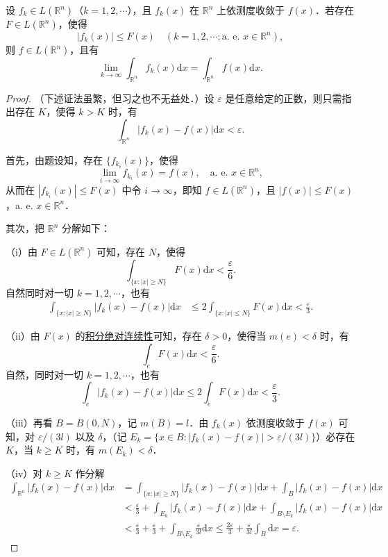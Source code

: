 \documentclass[../../main.tex]{subfiles}
\begin{document}
\begin{theorem}[依测度收敛型控制收敛定理]\label{theorem:依测度收敛型控制收敛定理}
设 \( f_k \in L(\mathbb{R}^n) \)（\( k = 1,2,\cdots \)），且 \( f_k(x) \) 在 \( \mathbb{R}^n \) 上依测度收敛于 \( f(x) \)．若存在 \( F \in L(\mathbb{R}^n) \)，使得
\[
|f_k(x)| \leqslant F(x) \quad (k = 1,2,\cdots; \text{a. e. } x \in \mathbb{R}^n),
\]
则 \( f \in L(\mathbb{R}^n) \)，且有
\[
\lim_{k \to \infty} \int_{\mathbb{R}^n} f_k(x) \mathrm{d}x = \int_{\mathbb{R}^n} f(x) \mathrm{d}x.
\]
\end{theorem}
\begin{proof}
（下述证法虽繁，但习之也不无益处．）设 \( \varepsilon \) 是任意给定的正数，则只需指出存在 \( K \)，使得 \( k > K \) 时，有
\[
\int_{\mathbb{R}^n} |f_k(x) - f(x)| \mathrm{d}x < \varepsilon.
\]

首先，由题设知，存在 \( \{ f_{k_i}(x) \} \)，使得
\[
\lim_{i \to \infty} f_{k_i}(x) = f(x), \quad \text{a. e. } x \in \mathbb{R}^n,
\]
从而在 \( |f_{k_i}(x)| \leqslant F(x) \) 中令 \( i \to \infty \)，即知 \( f \in L(\mathbb{R}^n) \)，且 \( |f(x)| \leqslant F(x) \)，a. e. \( x \in \mathbb{R}^n \)．

其次，把 \( \mathbb{R}^n \) 分解如下：

（i）由 \( F \in L(\mathbb{R}^n) \) 可知，存在 \( N \)，使得
\[
\int_{\{ x : |x| \geqslant N \}} F(x) \mathrm{d}x < \frac{\varepsilon}{6}.
\]
自然同时对一切 \( k = 1,2,\cdots \)，也有
\begin{align*}
\int_{\{ x : |x| \geqslant N \}} |f_k(x) - f(x)| \mathrm{d}x &\leqslant 2 \int_{\{ x : |x| \leqslant N \}} F(x) \mathrm{d}x < \frac{\varepsilon}{3}.
\end{align*}

（ii）由 \( F(x) \) 的\hyperref[theorem:积分的绝对连续性]{积分绝对连续性}可知，存在 \( \delta > 0 \)，使得当 \( m(e) < \delta \) 时，有
\[
\int_{e} F(x) \mathrm{d}x < \frac{\varepsilon}{6}.
\]
自然，同时对一切 \( k = 1,2,\cdots \)，也有
\[
\int_{e} |f_k(x) - f(x)| \mathrm{d}x \leqslant 2 \int_{e} F(x) \mathrm{d}x < \frac{\varepsilon}{3}.
\]

（iii）再看 \( B = B(0, N) \)，记 \( m(B) = l \)．由 \( f_k(x) \) 依测度收敛于 \( f(x) \) 可知，对 \( \varepsilon/(3l) \) 以及 \( \delta \)，（记 \( E_k = \{ x \in B : |f_k(x) - f(x)| > \varepsilon/(3l) \} \)）必存在 \( K \)，当 \( k \geqslant K \) 时，有 \( m(E_k) < \delta \)．

（iv）对 \( k \geqslant K \) 作分解
\begin{align*}
\int_{\mathbb{R}^n} |f_k(x) - f(x)| \mathrm{d}x &= \int_{\{ x : |x| \geqslant N \}} |f_k(x) - f(x)| \mathrm{d}x + \int_{B} |f_k(x) - f(x)| \mathrm{d}x \\
&< \frac{\varepsilon}{3} + \int_{E_k} |f_k(x) - f(x)| \mathrm{d}x + \int_{B \setminus E_k} |f_k(x) - f(x)| \mathrm{d}x \\
&< \frac{\varepsilon}{3} + \frac{\varepsilon}{3} + \int_{B \setminus E_k} \frac{\varepsilon}{3l} \mathrm{d}x \leqslant \frac{2\varepsilon}{3} + \frac{\varepsilon}{3l} \int_{B} \mathrm{d}x = \varepsilon.
\end{align*}
\end{proof}
\end{document}
